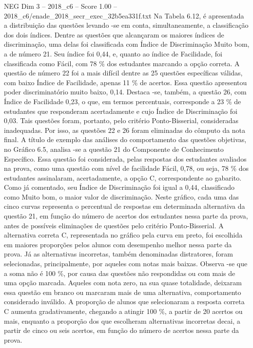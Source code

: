 \begin{textsample}{NEG Dim 3 – 2018\_c6 – Score 1.00 – 2018\_c6/enade\_2018\_secr\_exec\_32b5ea331f.txt}
Na Tabela 6.12, é apresentada a distribuição das questões levando -se em conta, simultaneamente, a classificação dos dois índices.
Dentre as questões que alcançaram os maiores índices de discriminação, uma delas foi classificada com Índice de Discriminação Muito bom, a de número 21.
Seu índice foi 0,44, e, quanto ao índice de Facilidade, foi classificada como Fácil, com 78 \% dos estudantes marcando a opção correta.
A questão de número 22 foi a mais difícil dentre as 25 questões específicas válidas, com baixo Índice de Facilidade, apenas 11 \% de acertos.
Essa questão apresentou poder discriminatório muito baixo, 0,14.
Destaca -se, também, a questão 26, com Índice de Facilidade 0,23, o que, em termos percentuais, corresponde a 23 \% de estudantes que responderam acertadamente e cujo Índice de Discriminação foi 0,03.
Tais questões foram, portanto, pelo critério Ponto-Bisserial, consideradas inadequadas.
Por isso, as questões 22 e 26 foram eliminadas do cômputo da nota final.
A título de exemplo das análises do comportamento das questões objetivas, no Gráfico 6.5, analisa -se a questão 21 do Componente de Conhecimento Específico.
Essa questão foi considerada, pelas respostas dos estudantes avaliados na prova, como uma questão com nível de facilidade Fácil, 0,78, ou seja, 78 \% dos estudantes assinalaram, acertadamente, a opção C, correspondente ao gabarito.
Como já comentado, seu Índice de Discriminação foi igual a 0,44, classificado como Muito bom, o maior valor de discriminação.
Neste gráfico, cada uma das cinco curvas representa o percentual de respostas em determinada alternativa da questão 21, em função do número de acertos dos estudantes nessa parte da prova, antes de possíveis eliminações de questões pelo critério Ponto-Bisserial.
A alternativa correta C, representada no gráfico pela curva em preto, foi escolhida em maiores proporções pelos alunos com desempenho melhor nessa parte da prova.
Já as alternativas incorretas, também denominadas distratores, foram selecionadas, principalmente, por aqueles com notas mais baixas.
Observa -se que a soma não é 100 \%, por causa das questões não respondidas ou com mais de uma opção marcada.
Aqueles com nota zero, na sua quase totalidade, deixaram essa questão em branco ou marcaram mais de uma alternativa, comportamento considerado inválido.
A proporção de alunos que selecionaram a resposta correta C aumenta gradativamente, chegando a atingir 100 \%, a partir de 20 acertos ou mais, enquanto a proporção dos que escolheram alternativas incorretas decai, a partir de cinco ou seis acertos, em função do número de acertos nessa parte da prova.

\end{textsample}
